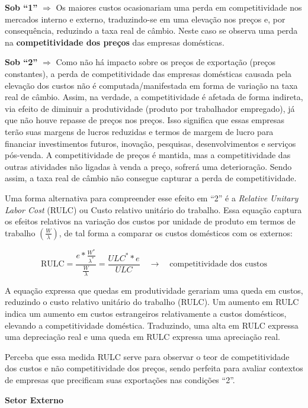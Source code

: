 \documentclass[a4paper,12pt]{article}[abntex2]
\begin{document}
\textbf{Sob ``1''} $\Rightarrow$ Os maiores custos ocasionariam uma perda em competitividade nos mercados interno e externo, traduzindo-se em uma elevação nos preços e, por consequência, reduzindo a taxa real de câmbio.  
Neste caso se observa uma perda na \textbf{competitividade dos preços} das empresas domésticas.

\textbf{Sob ``2''} $\Rightarrow$ Como não há impacto sobre os preços de exportação (preços constantes), a perda de competitividade das empresas domésticas causada pela elevação dos custos não é computada/manifestada em forma de variação na taxa real de câmbio.  
Assim, na verdade, a competitividade é afetada de forma indireta, via efeito de diminuir a produtividade (produto por trabalhador empregado), já que não houve repasse de preços nos preços.  
Isso significa que essas empresas terão suas margens de lucros reduzidas e termos de margem de lucro para financiar investimentos futuros, inovação, pesquisas, desenvolvimentos e serviços pós-venda.  
A competitividade de preços é mantida, mas a competitividade das outras atividades não ligadas à venda a preço, sofrerá uma deterioração.
Sendo assim, a taxa real de câmbio não consegue capturar a perda de competitividade.


Uma forma alternativa para compreender esse efeito em ``2'' é a \textit{Relative Unitary Labor Cost} (RULC) ou Custo relativo unitário do trabalho.  
Essa equação captura os efeitos relativos na variação dos custos por unidade de produto em termos de trabalho $\left( \frac{W}{\lambda} \right)$, de tal forma a comparar os custos domésticos com os externos:

\[
\text{RULC} = \frac{e \ast \frac{W^{\ast}}{\lambda^{\ast}}}{\frac{W}{\lambda}}
= \frac{ULC^{\ast} \ast e}{ULC}
\quad \rightarrow \quad
\text{competitividade dos custos}
\]


A equação expressa que quedas em produtividade gerariam uma queda em custos, reduzindo o custo relativo unitário do trabalho (RULC).  
Um aumento em RULC indica um aumento em custos estrangeiros relativamente a custos domésticos, elevando a competitividade doméstica.  
Traduzindo, uma alta em RULC expressa uma depreciação real e uma queda em RULC expressa uma apreciação real.


Perceba que essa medida RULC serve para observar o teor de competitividade dos custos e não competitividade dos preços, sendo perfeita para avaliar contextos de empresas que precificam suas exportações nas condições ``2''.

\textbf{Setor Externo}
\end{document}
